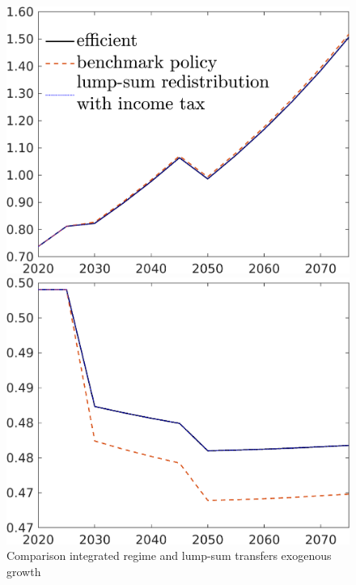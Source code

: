 \begin{figure}[h!!]
	\centering
	\caption{Comparison integrated regime and lump-sum transfers exogenous growth}\label{fig:bench_lumpsum_xgr}
	
	\begin{minipage}[]{0.32\textwidth}
		\includegraphics[width=1\textwidth]{../../codding_model/own_basedOnFried/optimalPol_190722_tidiedUp/figures/all_July22/C_CompEffOPT_T_NoTaus_pol4_spillover0_noskill0_sep1_xgrowth1_etaa0.79_lgd1_lff0.png}
	\end{minipage}
	\begin{minipage}[]{0.32\textwidth}
		\includegraphics[width=1\textwidth]{../../codding_model/own_basedOnFried/optimalPol_190722_tidiedUp/figures/all_July22/hh_CompEffOPT_T_NoTaus_pol4_spillover0_noskill0_sep1_xgrowth1_etaa0.79_lgd0_lff0.png}

\end{minipage}
\end{figure}
